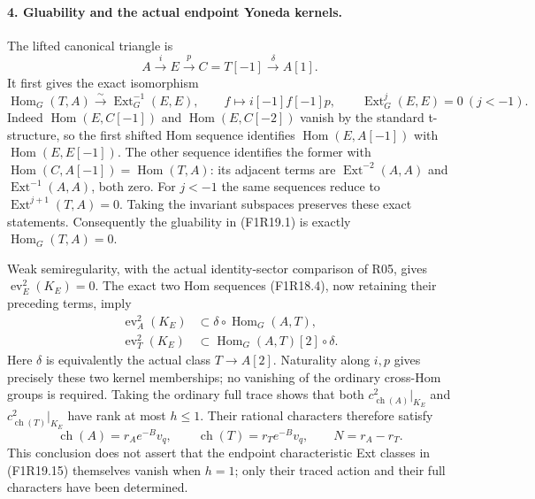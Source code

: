 \paragraph{4. Gluability and the actual endpoint Yoneda kernels.}
The lifted canonical triangle is
\[
           A\xrightarrow{i}E\xrightarrow{p}C=T[-1]
                                  \xrightarrow{\delta}A[1].
 \tag{F1R19.13}
\]
It first gives the exact isomorphism
\[
 \operatorname{Hom}_G(T,A)\xrightarrow{\sim}
       \operatorname{Ext}^{-1}_G(E,E),\qquad
       f\longmapsto i[-1]f[-1]p,
 \qquad \operatorname{Ext}^{j}_G(E,E)=0\ (j<-1).
 \tag{F1R19.14}
\]
Indeed $\operatorname{Hom}(E,C[-1])$ and
$\operatorname{Hom}(E,C[-2])$ vanish by the standard
t-structure, so the first shifted Hom sequence
identifies $\operatorname{Hom}(E,A[-1])$ with
$\operatorname{Hom}(E,E[-1])$. The other sequence
identifies the former with
$\operatorname{Hom}(C,A[-1])=\operatorname{Hom}(T,A)$:
its adjacent terms are $\operatorname{Ext}^{-2}(A,A)$
and $\operatorname{Ext}^{-1}(A,A)$, both zero.
For $j<-1$ the same sequences reduce to
$\operatorname{Ext}^{j+1}(T,A)=0$. Taking the invariant
subspaces preserves these exact statements.
Consequently the gluability in (F1R19.1) is exactly
$\operatorname{Hom}_G(T,A)=0$.

Weak semiregularity, with the actual identity-sector
comparison of R05, gives
$\operatorname{ev}_E^2(K_E)=0$. The exact two Hom
sequences (F1R18.4), now retaining their preceding
terms, imply
\[
 \begin{split}
 \operatorname{ev}_A^2(K_E)&\subset
       \delta\circ\operatorname{Hom}_G(A,T),\\
 \operatorname{ev}_T^2(K_E)&\subset
       \operatorname{Hom}_G(A,T)[2]\circ\delta.
 \end{split}
 \tag{F1R19.15}
\]
Here $\delta$ is equivalently the actual class
$T\to A[2]$. Naturality along $i,p$ gives precisely
these two kernel memberships; no vanishing of the
ordinary cross-Hom groups is required. Taking the
ordinary full trace shows that both
$c^2_{\operatorname{ch}(A)}|_{K_E}$ and
$c^2_{\operatorname{ch}(T)}|_{K_E}$ have rank at most
$h\le1$. Their rational characters therefore satisfy
\[
          \operatorname{ch}(A)=r_Ae^{-B}v_q,
      \qquad \operatorname{ch}(T)=r_Te^{-B}v_q,
      \qquad N=r_A-r_T.
 \tag{F1R19.16}
\]
This conclusion does not assert that the endpoint
characteristic Ext classes in (F1R19.15) themselves
vanish when $h=1$; only their traced action and their
full characters have been determined.

